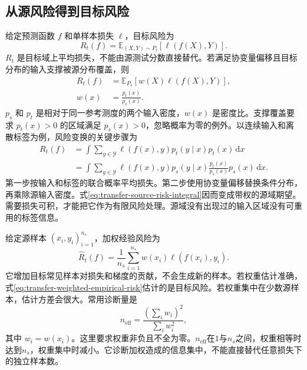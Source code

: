 \subsection{从源风险得到目标风险}
给定预测函数 $f$ 和单样本损失 $\ell$，目标风险为
\begin{equation}
 R_t(f)=\mathbb E_{(X,Y)\sim P_t}\left[\ell(f(X),Y)\right].
\label{eq:transfer-target-risk}
\end{equation}
$R_t$ 是目标域上平均损失，不能由源测试分数直接替代。若满足协变量偏移且目标分布的输入支撑被源分布覆盖，则
\begin{align}
R_t(f)
&=\mathbb E_{P_s}\left[w(X)\ell(f(X),Y)\right],\\
 w(x)&=\frac{p_t(x)}{p_s(x)}.
\label{eq:transfer-importance-weight}
\end{align}
$p_s$ 和 $p_t$ 是相对于同一参考测度的两个输入密度，$w(x)$ 是密度比。支撑覆盖要求 $p_t(x)>0$ 的区域满足 $p_s(x)>0$，忽略概率为零的例外。以连续输入和离散标签为例，风险变换的关键步骤为
\begin{align}
 R_t(f)&=\int\sum_{y\in\mathcal Y}\ell(f(x),y)p_t(y\mid x)p_t(x)\,\mathrm dx\\
 &=\int\sum_{y\in\mathcal Y}\ell(f(x),y)p_s(y\mid x)
 \frac{p_t(x)}{p_s(x)}p_s(x)\,\mathrm dx.
 \label{eq:transfer-source-risk-integral}
\end{align}
第一步按输入和标签的联合概率平均损失。第二步使用协变量偏移替换条件分布，再乘除源输入密度。式\eqref{eq:transfer-source-risk-integral}因而变成带权的源域期望。需要损失可积，才能把它作为有限风险处理。源域没有出现过的输入区域没有可重用的标签信息。

给定源样本 $(x_i,y_i)_{i=1}^{n_s}$，加权经验风险为
\begin{equation}
\widehat R_t(f)=\frac1{n_s}\sum_{i=1}^{n_s}w(x_i)\ell(f(x_i),y_i).
\label{eq:transfer-weighted-empirical-risk}
\end{equation}
它增加目标常见样本对损失和梯度的贡献，不会生成新的样本。若权重估计准确，式\eqref{eq:transfer-weighted-empirical-risk}估计的是目标风险。若权重集中在少数源样本，估计方差会很大。常用诊断量是
\begin{equation}
 n_{\mathrm{eff}}=\frac{(\sum_iw_i)^2}{\sum_iw_i^2},
\end{equation}
其中 $w_i=w(x_i)$。这里要求权重非负且不全为零。$n_{\mathrm{eff}}$在$1$与$n_s$之间，权重相等时达到$n_s$，权重集中时减小。它诊断加权造成的信息集中，不能直接替代任意损失下的独立样本数。

